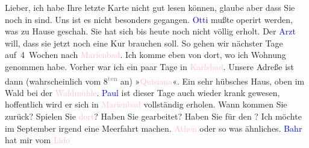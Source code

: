 \pstart
           Lieber, ich habe Ihre letzte Karte nicht gut lesen können, glaube
               aber dass Sie noch in \label{K_L03489-1v}\label{K_L03489-1h} sind. Uns ist es nicht besonders gegangen. \textcolor{blue}{Otti}{}\ledrightnote{\textcolor{blue}{Ottilie Salten}} mußte operirt werden, was zu Hause geschah. Sie hat sich bis heute noch nicht völlig erholt. Der \textcolor{blue}{Arzt}{}\ledrightnote{{$\rightarrow$}\textcolor{blue}{?? [Arzt von Ottilie Salten]}} will, dass sie jetzt noch eine Kur
               brauchen soll. So gehen wir nächster Tage auf 4 Wochen nach \textcolor{pink}{Marienbad}{}\ledrightnote{\textcolor{pink}{Marienbad}}. Ich komme eben von dort, wo ich Wohnung genommen
               habe. Vorher war ich ein paar Tage in \textcolor{pink}{Karlsbad}{}\ledrightnote{\textcolor{pink}{Karlsbad}}.
               Unsere Adreße ist dann (wahrscheinlich vom 8\textsuperscript{\textcolor{gray}{ten}} an) »\textcolor{pink}{Quisiana}{}\ledrightnote{\textcolor{pink}{Hotel Quisisana}}«.
               Ein sehr hübsches Haus, oben im Wald bei der \textcolor{pink}{Waldmühle}{}\ledrightnote{\textcolor{pink}{Hotel Waldmühle}}. \textcolor{blue}{Paul}{}\ledrightnote{\textcolor{blue}{Paul Salten}} ist dieser Tage auch
               wieder krank gewesen, hoffentlich wird er sich in \textcolor{pink}{Marienbad}{}\ledrightnote{\textcolor{pink}{Marienbad}} vollständig erholen. Wann kommen Sie \label{K_L03489-2v}\label{K_L03489-2h} zurück? Spielen Sie \textcolor{pink}{dort}{}\ledrightnote{{$\rightarrow$}\textcolor{pink}{Welsberg-Taisten}}{ }\label{K_L03489-3v}\label{K_L03489-3h}? Haben Sie gearbeitet? Haben Sie für den \label{K_L03489-4v}\label{K_L03489-4h}? Ich
               möchte im September irgend eine Meerfahrt machen. \textcolor{pink}{Athen}{}\ledrightnote{\textcolor{pink}{Athen}} oder so was ähnliches. \textcolor{blue}{Bahr}{}\ledrightnote{\textcolor{blue}{Hermann Bahr}} hat mir vom \textcolor{pink}{Lido}{}\ledrightnote{\textcolor{pink}{Lido}}
